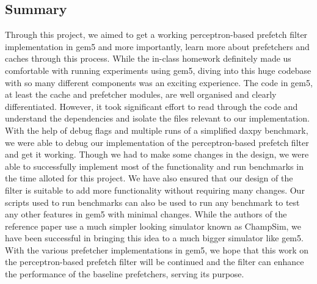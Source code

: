 \documentclass[10pt,conference]{IEEEtran}
\begin{document}
\subsection{Summary}
Through this project, we aimed to get a working perceptron-based prefetch filter implementation in gem5 and more importantly, learn more about prefetchers and caches through this process. While the in-class homework definitely made us comfortable with running experiments using gem5, diving into this huge codebase with so many different components was an exciting experience. The code in gem5, at least the cache and prefetcher modules, are well organised and clearly differentiated. However, it took significant effort to read through the code and understand the dependencies and isolate the files relevant to our implementation. With the help of debug flags and multiple runs of a simplified daxpy benchmark, we were able to debug our implementation of the perceptron-based prefetch filter and get it working. Though we had to make some changes in the design, we were able to successfully implement most of the functionality and run benchmarks in the time alloted for this project. We have also ensured that our design of the filter is suitable to add more functionality without requiring many changes. Our scripts used to run benchmarks can also be used to run any benchmark to test any other features in gem5 with minimal changes. While the authors of the reference paper\cite{ppf} use a much simpler looking simulator known as ChampSim\cite{champsim}, we have been successful in bringing this idea to a much bigger simulator like gem5. With the various prefetcher implementations in gem5, we hope that this work on the perceptron-based prefetch filter will be continued and the filter can enhance the performance of the baseline prefetchers, serving its purpose. 
\end{document}
